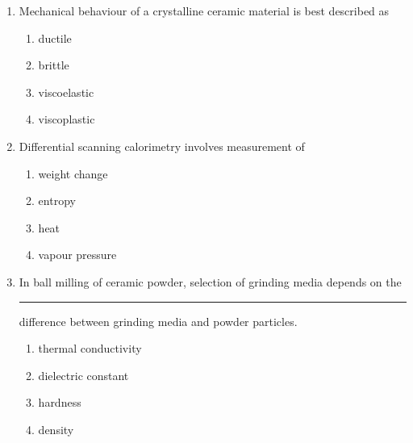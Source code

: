 \documentclass[journal]{IEEEtran}
\begin{document}
\begin{enumerate}[start=40]
\begin{multicols}{2}
\begin{enumerate}
\item $ \alpha $ -- water; $ \beta $ -- vapour; $ \gamma $ -- ice 
\item $ \alpha $ -- ice; $ \beta $ -- water; $ \gamma $ -- vapour
\item $\alpha $ -- vapour; $ \beta $ -- ice; $ \gamma $ -- water
\item $\alpha $ -- water; $ \beta $ -- ice; $ \gamma $ -- vapour
\end{enumerate}
\end{multicols}

\item Mechanical behaviour of a crystalline ceramic material is best described as

\begin{multicols}{4}
\begin{enumerate}
\item ductile
\item brittle
\item viscoelastic
\item viscoplastic
\end{enumerate}
\end{multicols}

\item Differential scanning calorimetry involves measurement of 
\begin{multicols}{4}
\begin{enumerate}
\item weight change
\item entropy 
\item heat 
\item vapour pressure
\end{enumerate}
\end{multicols}

\item In ball milling of ceramic powder, selection of grinding media depends on the
\rule{1cm}{0.4 pt} difference between grinding media and powder particles. 
\begin{multicols}{2}
\begin{enumerate}
\item thermal conductivity 
\item dielectric constant
\item hardness
\item density
\end{enumerate}
\end{multicols}


\end{enumerate}
\end{document}
